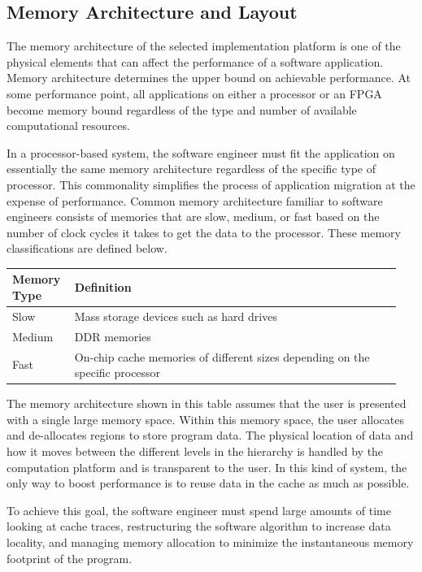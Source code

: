 \subsection{Memory Architecture and Layout}
The memory architecture of the selected implementation platform is one of the physical
elements that can affect the performance of a software application. Memory architecture
determines the upper bound on achievable performance. At some performance point, all
applications on either a processor or an FPGA become memory bound regardless of the
type and number of available computational resources. 


In a processor-based system, the software engineer must fit the application on essentially
the same memory architecture regardless of the specific type of processor. This
commonality simplifies the process of application migration at the expense of performance.
Common memory architecture familiar to software engineers consists of memories that are
slow, medium, or fast based on the number of clock cycles it takes to get the data to the
processor. These memory classifications are defined below.

\begin{table}[H]
  \begin{tabular}{|p{0.15\linewidth} | p{0.80\linewidth}|}
  \hline
  \textbf{Memory Type}    &  \textbf{Definition} \\ \hline
  Slow           & Mass storage devices such as hard drives \\ \hline
  Medium         & DDR memories \\ \hline
  Fast           & On-chip cache memories of different sizes depending on the specific processor \\ \hline
  \end{tabular}
\end{table}

The memory architecture shown in this table assumes that the user is presented with a
single large memory space. Within this memory space, the user allocates and de-allocates
regions to store program data. The physical location of data and how it moves between the
different levels in the hierarchy is handled by the computation platform and is transparent
to the user. In this kind of system, the only way to boost performance is to reuse data in the
cache as much as possible.

\par To achieve this goal, the software engineer must spend large amounts of time looking at
cache traces, restructuring the software algorithm to increase data locality, and managing
memory allocation to minimize the instantaneous memory footprint of the program.

